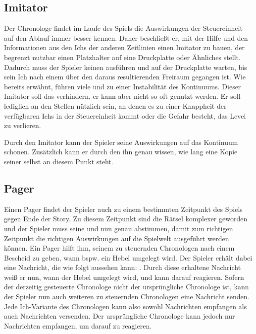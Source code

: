 \subsection{Imitator}\label{sec:concept_imitator}
Der Chronologe findet im Laufe des Spiels die Auswirkungen der Steuereinheit auf den Ablauf immer besser kennen. Daher beschließt er, mit der Hilfe und den Informationen aus den Ichs der anderen Zeitlinien einen Imitator zu bauen, der begrenzt nutzbar einen Platzhalter auf eine Druckplatte oder Ähnliches stellt. Dadurch muss der Spieler keinen  ausführen und auf der Druckplatte warten, bis sein Ich nach einem  über den daraus resultierenden Freiraum gegangen ist. Wie bereits erwähnt, führen viele  und  zu einer Instabilität des Kontinuums. Dieser Imitator soll das verhindern, er kann aber nicht so oft genutzt werden. Er soll lediglich an den Stellen nützlich sein, an denen es zu einer Knappheit der verfügbaren Ichs in der Steuereinheit kommt oder die Gefahr besteht, das Level zu verlieren. 

Durch den Imitator kann der Spieler seine Auswirkungen auf das Kontinuum schonen. Zusätzlich kann er durch den ihn genau wissen, wie lang eine Kopie seiner selbst an diesem Punkt steht.

\subsection{Pager}
Einen Pager findet der Spieler auch zu einem bestimmten Zeitpunkt des Spiels gegen Ende der Story. Zu diesem Zeitpunkt sind die Rätsel komplexer geworden und der Spieler muss seine  und  nun genau abstimmen, damit zum richtigen Zeitpunkt die richtigen Auswirkungen auf die Spielwelt ausgeführt werden können. Ein Pager hilft ihm, seinem zu steuernden Chronologen nach einem  Bescheid zu geben, wann bspw. ein Hebel umgelegt wird. Der Spieler erhält dabei eine Nachricht, die wie folgt aussehen kann: . Durch diese erhaltene Nachricht weiß er nun, wann der Hebel umgelegt wird, und kann darauf reagieren. Sofern der derzeitig gesteuerte Chronologe nicht der ursprüngliche Chronologe ist, kann der Spieler nun auch weiteren zu steuernden Chronologen eine Nachricht senden. Jede Ich-Variante des Chronologen kann also sowohl Nachrichten empfangen als auch Nachrichten versenden. Der ursprüngliche Chronologe kann jedoch nur Nachrichten empfangen, um darauf zu reagieren.

